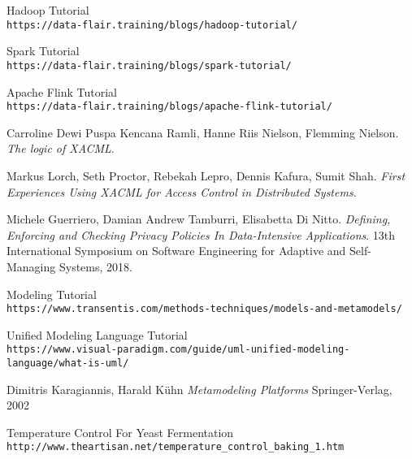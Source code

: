 \begin{thebibliography}{9}

Hadoop Tutorial
\\\texttt{https://data-flair.training/blogs/hadoop-tutorial/}

Spark Tutorial
\\\texttt{https://data-flair.training/blogs/spark-tutorial/}

Apache Flink Tutorial
\\\texttt{https://data-flair.training/blogs/apache-flink-tutorial/}

Carroline Dewi Puspa Kencana Ramli, Hanne Riis Nielson, Flemming Nielson.
\textit{The logic of XACML}.

Markus Lorch, Seth Proctor, Rebekah Lepro, Dennis Kafura, Sumit Shah.
\textit{First Experiences Using XACML for Access Control in Distributed Systems}.

Michele Guerriero, Damian Andrew Tamburri, Elisabetta Di Nitto.
\textit{Defining, Enforcing and Checking Privacy Policies In Data-Intensive Applications}. 
13th International Symposium on Software Engineering for Adaptive and Self-Managing Systems, 2018.

Modeling Tutorial
\\\texttt{https://www.transentis.com/methods-techniques/models-and-metamodels/}

Unified Modeling Language Tutorial
\\\texttt{https://www.visual-paradigm.com/guide/uml-unified-modeling-language/what-is-uml/}

Dimitris Karagiannis, Harald Kühn
\textit{Metamodeling Platforms}
Springer-Verlag, 2002

Temperature Control For Yeast Fermentation
\\\texttt{http://www.theartisan.net/temperature\_control\_baking\_1.htm}


\end{thebibliography}
